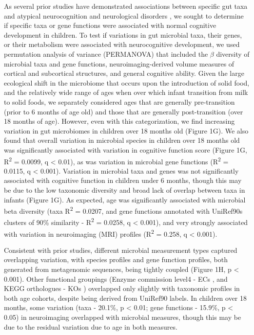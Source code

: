 \documentclass{article}
\begin{document}
As several prior studies have demonstrated associations between specific gut taxa
and atypical neurocognition and neurological disorders
\cite{liuAlteredGutMicrobiota2019,wanUnderdevelopmentGutMicrobiota2021,
      magnussonRelationshipsDietrelatedChanges2015,mayneris-perxachsMicrobiotaAlterationsProline2022,
      needhamGutderivedMetaboliteAlters2022},
we sought to determine if specific taxa or gene functions were associated
with normal cognitive development in children.
To test if variations in gut microbial taxa,
their genes, or their metabolism were associated with neurocognitive
development, we used permutation analysis of variance (PERMANOVA) 
that included the $\beta$ diversity of microbial taxa and gene functions,
neuroimaging-derived volume measures of cortical and subcortical structures,
and general cognitive ability.
Given the large ecological shift in the microbiome that occurs upon the introduction of solid food,
and the relatively wide range of ages when over which infant transition from milk to solid foods,
we separately considered ages that are generally pre-transition (prior to 6 months of age old)
and those that are generally post-transition (over 18 months of age).
However, even with this categorization, we find increasing variation
in gut microbiomes in children over 18 months old (Figure 1G).
We also found that overall variation in microbial species in children over 18 months old
was significantly associated with variation in cognitive function score
(Figure 1G, R\textsuperscript{2} = 0.0099, q \textless{} 0.01),
as was variation in microbial gene functions (R\textsuperscript{2} = 0.0115, q \textless{} 0.001).
Variation in microbial taxa and genes was not significantly associated with cognitive
function in children under 6 months, though this may be due to the low
taxonomic diversity and broad lack of overlap between taxa in infants (Figure 1G).
As expected, age was significantly associated with microbial beta
diversity (taxa R\textsuperscript{2} = 0.0207, and  gene functions
annotated with UniRef90s clusters of 90\% similarity
\cite{suzekUniRefComprehensiveNonredundant2007} -
R\textsuperscript{2} = 0.0258, q \textless{} 0.001), and very strongly
associated with variation in neuroimaging (MRI) profiles (R\textsuperscript{2} = 0.258, q
\textless{} 0.001).

Consistent with prior studies, different microbial measurement types
captured overlapping variation, with species profiles and gene function
profiles, both generated from metagenomic sequences, being tightly coupled
(Figure 1H, p \textless{} 0.001). Other functional
groupings (Enzyme commission level4 - ECs
\cite{bairochENZYMEDatabase20002000},
and KEGG orthologues - KOs
\cite{kanehisaKEGGResourceDeciphering2004})
overlapped only slightly with taxonomic profiles in both age
cohorts, despite being derived from UniRef90 labels. In children over 18
months, some variation (taxa - 20.1\%, p \textless{} 0.01;
gene functions - 15.9\%, p \textless{} 0.05) in neuroimaging
overlapped with microbial measures, though this may be due to the
residual variation due to age in both measures.
\end{document}
